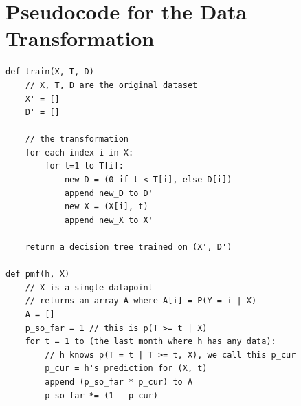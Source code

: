 \documentclass[a4paper,11pt]{article}
\begin{document}
\appendix
\section{Pseudocode for the Data Transformation}
\label{subsec:pseudocode}

\begin{verbatim}
def train(X, T, D)
    // X, T, D are the original dataset
    X' = []
    D' = []

    // the transformation
    for each index i in X:
        for t=1 to T[i]:
            new_D = (0 if t < T[i], else D[i])
            append new_D to D'
            new_X = (X[i], t)
            append new_X to X'

    return a decision tree trained on (X', D')

def pmf(h, X)
    // X is a single datapoint
    // returns an array A where A[i] = P(Y = i | X)
    A = []
    p_so_far = 1 // this is p(T >= t | X)
    for t = 1 to (the last month where h has any data):
        // h knows p(T = t | T >= t, X), we call this p_cur
        p_cur = h's prediction for (X, t)
        append (p_so_far * p_cur) to A
        p_so_far *= (1 - p_cur)

\end{verbatim}


%

%

\end{document}
